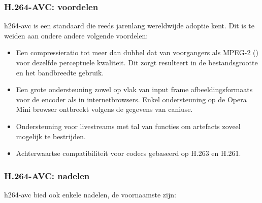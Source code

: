 \subsubsection{H.264-AVC: voordelen}
\label{sec:videocompressie-h264-AVC-voordelen}

\Gls{h264-avc} is een standaard die reeds jarenlang wereldwijde adoptie kent. Dit is te weiden aan ondere andere volgende voordelen:

\begin{itemize}
	
	\item Een \gls{compressieratio} tot meer dan dubbel dat van voorgangers als MPEG-2 (\cite{h264avcmpeg2kwaliteit}) voor dezelfde perceptuele kwaliteit. Dit zorgt resulteert in de bestandsgrootte en het \gls{bandbreedte} gebruik.
	
	\item Een grote ondersteuning zowel op vlak van input \gls{frame} \glspl{afbeeldingsformaat} voor de \gls{encoder} als in internetbrowsers. Enkel ondersteuning op de Opera Mini browser ontbreekt volgens de gegevens van caniuse.
	
	\item Ondersteuning voor livestreams met tal van functies om \glspl{artefact} zoveel mogelijk te bestrijden.
	
	\item Achterwaartse compatibiliteit voor \glspl{codec} gebaseerd op H.263 en H.261.
	
\end{itemize}

\subsubsection{H.264-AVC: nadelen}
\label{sec:videocompressie-h264-AVC-nadelen}

\Gls{h264-avc} bied ook enkele nadelen, de voornaamste zijn:

